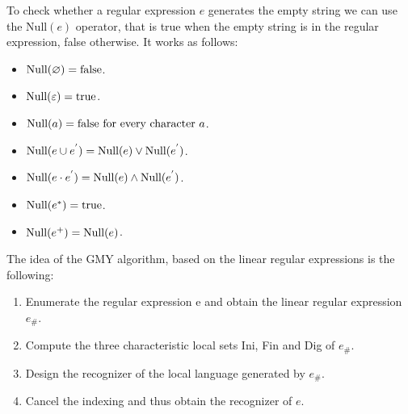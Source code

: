 To check whether a regular expression $e$ generates the empty string we can use the Null$(e)$ operator, that is true when the empty string is in the regular expression, false otherwise. 
It works as follows: 
\begin{itemize}
    \item $\textnormal{Null}(\varnothing)=\textnormal{false}$. 
    \item $\textnormal{Null}(\varepsilon)=\textnormal{true}$. 
    \item $\textnormal{Null}(a)=\textnormal{false for every character } a$.
    \item $\textnormal{Null}(e \cup e^{'})=\textnormal{Null}(e) \lor \textnormal{Null}(e^{'})$.
    \item $\textnormal{Null}(e \cdot e^{'})=\textnormal{Null}(e) \land \textnormal{Null}(e^{'})$.
    \item $\textnormal{Null}(e^{*})=\textnormal{true}$. 
    \item $\textnormal{Null}(e^{+})=\textnormal{Null}(e)$. 
\end{itemize}
The idea of the GMY algorithm, based on the linear regular expressions is the following: 
\begin{enumerate}
    \item Enumerate the regular expression e and obtain the linear regular expression $e_{\#}$. 
    \item Compute the three characteristic local sets Ini, Fin and Dig of $e_{\#}$.
    \item Design the recognizer of the local language generated by $e_{\#}$.
    \item Cancel the indexing and thus obtain the recognizer of $e$.
\end{enumerate}
